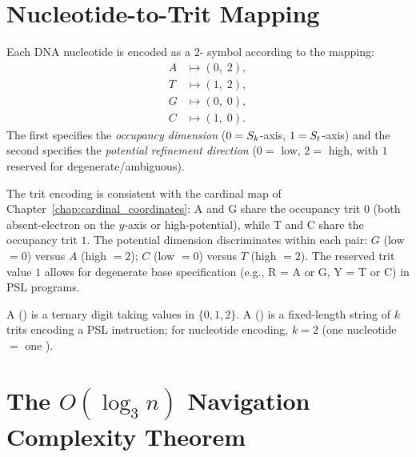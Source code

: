 \section{Nucleotide-to-Trit Mapping}
\label{sec:trit_mapping}

\begin{definition}
\label{def:trit_encoding}
Each DNA nucleotide is encoded as a 2-\trit{} symbol according to the mapping:
\begin{align}
  A &\mapsto (0,\; 2), \label{eq:A_trit}\\
  T &\mapsto (1,\; 2), \label{eq:T_trit}\\
  G &\mapsto (0,\; 0), \label{eq:G_trit}\\
  C &\mapsto (1,\; 0). \label{eq:C_trit}
\end{align}
The first \trit{} specifies the \emph{occupancy dimension}
($0 = S_k$-axis, $1 = S_t$-axis) and the second \trit{} specifies
the \emph{potential refinement direction}
($0 = $ low, $2 = $ high, with $1$ reserved for degenerate/ambiguous).
\end{definition}

\begin{remark}
The trit encoding is consistent with the cardinal map of
Chapter~\ref{chap:cardinal_coordinates}: A and G share the occupancy
trit $0$ (both absent-electron on the $y$-axis or high-potential),
while T and C share the occupancy trit $1$. The potential dimension
discriminates within each pair: $G$ (low $= 0$) versus $A$ (high $= 2$);
$C$ (low $= 0$) versus $T$ (high $= 2$). The reserved trit value $1$
allows for degenerate base specification (e.g., R = A or G, Y = T or C)
in PSL programs.
\end{remark}

\begin{definition}
\label{def:trit_tryte}
A \emph{\trit} (\trit{}) is a ternary digit taking values in $\{0, 1, 2\}$.
A \emph{\tryte} (\tryte{}) is a fixed-length string of $k$ trits encoding
a PSL instruction; for nucleotide encoding, $k = 2$ (one nucleotide $=$ one \tryte).
\end{definition}

\section{The $O(\log_3 n)$ Navigation Complexity Theorem}
\label{sec:navigation_complexity}

